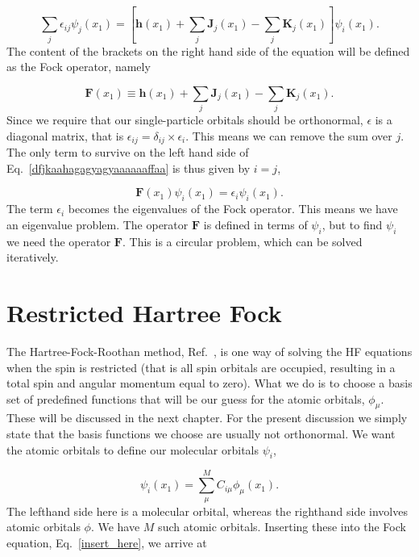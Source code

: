 \documentclass[a4paper,norsk,11pt,twoside]{report}
\begin{document}
\begin{equation}
\sum_j \epsilon_{ij} \psi_j(x_1) = 
\left[
\textbf{h}(x_1)  
+ \sum_j \textbf{J}_j(x_1) 
- \sum_j \textbf{K}_j(x_1) 
\right]
\psi_i(x_1)  .
\label{dfjkaahagagyagyaaaaaaffaa}
\end{equation}
The content of the brackets on the right hand side of the equation will be defined as the Fock operator, namely 

\begin{equation}
\textbf{F}(x_1) \equiv \textbf{h}(x_1)  + \sum_j \textbf{J}_j(x_1) - \sum_j \textbf{K}_j(x_1) . 
\end{equation}
Since we require that our single-particle orbitals should be
orthonormal, $\epsilon$ is a diagonal matrix, that is $\epsilon_{ij}
= \delta_{ij} \times \epsilon_i$. This means we can remove the sum
over $j$. The only term to survive on the left hand side of
Eq.~\eqref{dfjkaahagagyagyaaaaaaffaa} is thus given by $i = j$,

\begin{equation}
\textbf{F}(x_1) \psi_i(x_1) = \epsilon_{i} \psi_i(x_1) . \label{insert_here}
\end{equation}
The term $\epsilon_{i}$ becomes the eigenvalues of the Fock
operator. This means we have an eigenvalue problem. The operator
$\textbf{F}$ is defined in terms of $\psi_i$, but to find $\psi_i$ we
need the operator $\textbf{F}$. This is a circular problem, which can
be solved iteratively.

\section{Restricted Hartree Fock}
The Hartree-Fock-Roothan method, Ref.~\cite{rothaan_new_citation}, is one way of
solving the HF equations when the spin is restricted (that is all spin orbitals are occupied, resulting in a total spin and angular momentum equal to zero). What we do is to
choose a basis set of predefined functions that will be our guess for the 
atomic orbitals, $\phi_{\mu}$. These will be discussed in the next
chapter. For the present discussion we simply state that the basis functions we choose are
usually not orthonormal. We want the atomic orbitals to define our
molecular orbitals $\psi_i$, 

\begin{equation}
\psi_i(x_1) = \sum_{\mu}^M C_{i \mu} \phi_{\mu}(x_1) .
\end{equation}
The lefthand side here is a molecular orbital, whereas the righthand side involves atomic orbitals $\phi$. We have $M$ such atomic orbitals. Inserting these into the Fock equation, Eq.~\eqref{insert_here}, we arrive at
\end{document}
